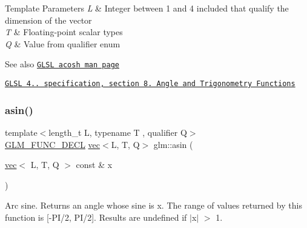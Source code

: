 \begin{DoxyTemplParams}{Template Parameters}
{\em L} & Integer between 1 and 4 included that qualify the dimension of the vector \\
\hline
{\em T} & Floating-\/point scalar types \\
\hline
{\em Q} & Value from qualifier enum\\
\hline
\end{DoxyTemplParams}
\begin{DoxySeeAlso}{See also}
\href{http://www.opengl.org/sdk/docs/manglsl/xhtml/acosh.xml}{\tt G\+L\+SL acosh man page} 

\href{http://www.opengl.org/registry/doc/GLSLangSpec.4.20.8.pdf}{\tt G\+L\+SL 4.. specification, section 8. Angle and Trigonometry Functions} 
\end{DoxySeeAlso}
\mbox{\label{group__core__func__trigonometric_ga0552d2df4865fa8c3d7cfc3ec2caac73}} 
\subsubsection{\texorpdfstring{asin()}{asin()}}
{\footnotesize\ttfamily template$<$length\+\_\+t L, typename T , qualifier Q$>$ \\
\mbox{\hyperlink{setup_8hpp_ab2d052de21a70539923e9bcbf6e83a51}{G\+L\+M\+\_\+\+F\+U\+N\+C\+\_\+\+D\+E\+CL}} \mbox{\hyperlink{structglm_1_1vec}{vec}}$<$L, T, Q$>$ glm\+::asin (\begin{DoxyParamCaption}\item[{\mbox{\hyperlink{structglm_1_1vec}{vec}}$<$ L, T, Q $>$ const \&}]{x }\end{DoxyParamCaption})}

Arc sine. Returns an angle whose sine is x. The range of values returned by this function is \mbox{[}-\/\+P\+I/2, P\+I/2\mbox{]}. Results are undefined if $\vert$x$\vert$ $>$ 1.


